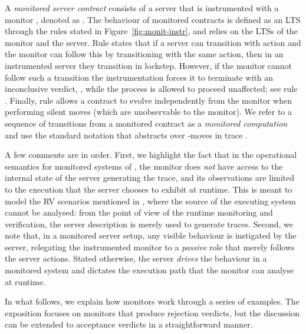 A \emph{monitored server contract} consists of a server  that is instrumented with a monitor \mV, denoted as .  The behaviour of monitored contracts is defined as an LTS through the rules stated in Figure~\ref{fig:monit-instr}, and relies on the \resp LTSs of the monitor and the server.  Rule  states that if a server can transition with action  and the  monitor can follow this by transitioning with the same action, then in an instrumented server  they transition in lockstep. However, if the monitor cannot follow such a transition the instrumentation forces it to terminate with an inconclusive verdict, \stp, while the process is allowed to proceed unaffected; see rule .  Finally, rule  allows a contract to evolve independently from the monitor when performing silent  moves (which are unobservable to the monitor).  We refer to a sequence of transitions from a monitored contract as a \emph{monitored computation} and use the standard notation  that abstracts over -moves in trace . 

A few comments are in order.  First, we highlight the fact that in the operational semantics for monitored systems of ,  the monitor does \emph{not} have access to the internal state of the server generating the trace, and its observations are limited to the execution that the server chooses to exhibit at runtime.  This is meant to model the RV scenarios mentioned in , where the source of the executing  system cannot be analysed: from the point of view of the runtime monitoring and verification, the server description is merely used to generate traces.  Second, we note that, in a monitored server setup, any visible behaviour is instigated by the server, relegating the instrumented monitor to a \emph{passive} role that merely follows the server actions. Stated otherwise, the server  \emph{drives} the behaviour in a monitored system  and dictates  the execution path that the monitor can analyse at runtime.

In what follows, we explain how monitors work through a series of examples. The exposition focuses on monitors that produce rejection verdicts, but the discussion can be extended to acceptance verdicts in a straightforward manner.


